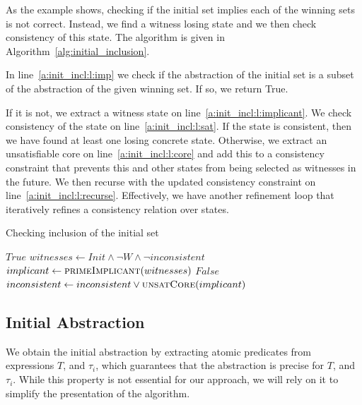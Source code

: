 As the example shows, checking if the initial set implies each of the winning sets is not correct. Instead, we find a witness losing state and we then check consistency of this state. The algorithm is given in Algorithm~\ref{alg:initial_inclusion}. 

In line~\ref{a:init_incl:l:imp} we check if the abstraction of the initial set is a subset of the abstraction of the given winning set. If so, we return True.

If it is not, we extract a witness state on line~\ref{a:init_incl:l:implicant}. We check consistency of the state on line~\ref{a:init_incl:l:sat}. If the state is consistent, then we have found at least one losing concrete state. Otherwise, we extract an unsatisfiable core on line~\ref{a:init_incl:l:core} and add this to a consistency constraint that prevents this and other states from being selected as witnesses in the future. We then recurse with the updated consistency constraint on line~\ref{a:init_incl:l:recurse}. Effectively, we have another refinement loop that iteratively refines a consistency relation over states. 

\begin{algorithm}
\caption{Checking inclusion of the initial set}
\label{alg:initial_inclusion}

\begin{algorithmic}[1]

 \label{a:init_incl:l:imp}
        \State\Return $True$
    \Else
        \State $witnesses \gets Init \land \neg W \land \neg inconsistent$ \label{a:init_incl:l:witness}
        \State $implicant \gets \Call{primeImplicant}{witnesses}$ \label{a:init_incl:l:implicant}
         \label{a:init_incl:l:sat}
            \State\Return $False$
        \Else
            \State $inconsistent \gets inconsistent \lor \Call{unsatCore}{implicant}$ \label{a:init_incl:l:core}
            \State{} \label{a:init_incl:l:recurse}
        \EndIf
    \EndIf
\EndFunction

\end{algorithmic}
\end{algorithm}

\subsection{Initial Abstraction}

We obtain the initial abstraction by extracting atomic predicates from expressions $T$, and $\tau_i$, which guarantees that the abstraction is precise for $T$, and $\tau_i$. While this property is not essential for our approach, we will rely on it to simplify the presentation of the algorithm.

